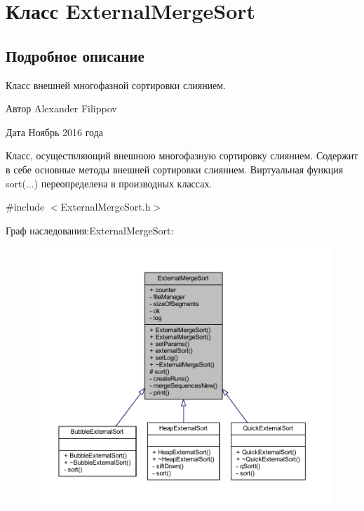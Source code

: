 \hypertarget{class_external_merge_sort}{}\section{Класс External\+Merge\+Sort}
\label{class_external_merge_sort}


\subsection{Подробное описание}
Класс внешней многофазной сортировки слиянием. 

\begin{DoxyAuthor}{Автор}
Alexander Filippov 
\end{DoxyAuthor}
\begin{DoxyDate}{Дата}
Ноябрь 2016 года
\end{DoxyDate}
Класс, осуществляющий внешнюю многофазную сортировку слиянием. Содержит в себе основные методы внешней сортировки слиянием. Виртуальная функция sort(...) переопределена в производных классах. 

{\ttfamily \#include $<$External\+Merge\+Sort.\+h$>$}



Граф наследования\+:External\+Merge\+Sort\+:\nopagebreak
\begin{figure}[H]
\begin{center}
\leavevmode
\includegraphics[width=350pt]{class_external_merge_sort__inherit__graph}
\end{center}
\end{figure}


